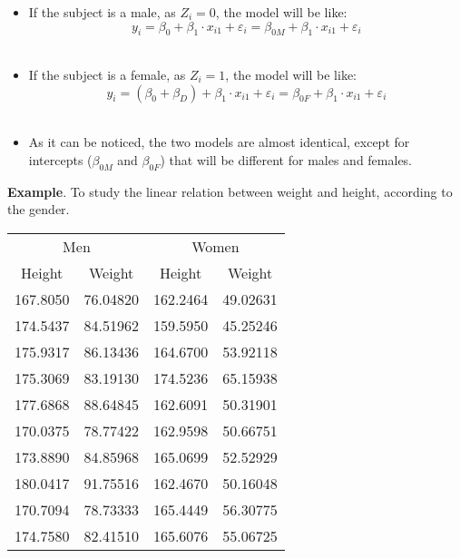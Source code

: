 \begin{frame}
  \vspace*{.25cm}
  \begin{itemize}
    \item If the subject is a male, as $ Z_i = 0 $, the model will be like:
    \vspace{-0.25cm} $$ y_i = \beta_0 + \beta_1 \cdot x_{i1} + \varepsilon_i = \beta_{0M} + \beta_1 \cdot x_{i1} + \varepsilon_i $$ \\
    \vspace{0.25cm}
    \item If the subject is a female, as $Z_i = 1$, the model will be like:
    \vspace{-0.50cm} $$ y_i = (\beta_0 + \beta_D) + \beta_1 \cdot x_{i1} + \varepsilon_i = \beta_{0F} + \beta_1 \cdot x_{i1} + \varepsilon_i $$ \\
    \vspace{0.25cm}
    \item As it can be noticed, the two models are almost identical, except for intercepts ($ \beta_{0M} $ and $ \beta_{0F }$) that will be different for males and females.
  \end{itemize}
\end{frame}

\begin{frame}
  \textbf{Example}. To study the linear relation between weight and height, according to the gender.\\
  \begin{center}
  \begin{tabular}{cccc}
    \hline
    \multicolumn{2}{c}{Men} & \multicolumn{2}{c}{Women} \\
    Height  & Weight     & Height  & Weight \\
    \hline
    167.8050 & 76.04820 & 162.2464 & 49.02631 \\
    174.5437 & 84.51962 & 159.5950 & 45.25246 \\
    175.9317 & 86.13436 & 164.6700 & 53.92118 \\
    175.3069 & 83.19130 & 174.5236 & 65.15938 \\
    177.6868 & 88.64845 & 162.6091 & 50.31901 \\
    170.0375 & 78.77422 & 162.9598 & 50.66751 \\
    173.8890 & 84.85968 & 165.0699 & 52.52929 \\
    180.0417 & 91.75516 & 162.4670 & 50.16048 \\
    170.7094 & 78.73333 & 165.4449 & 56.30775 \\
    174.7580 & 82.41510 & 165.6076 & 55.06725 \\
    \hline
  \end{tabular}
  \end{center}
\end{frame}

